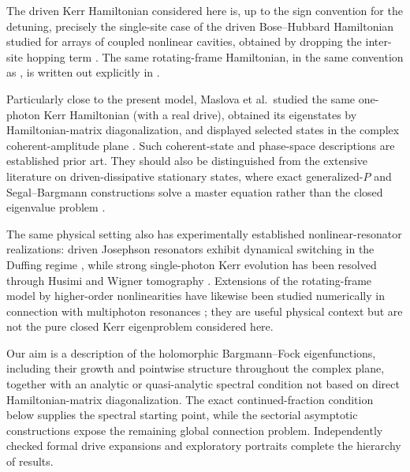 \documentclass[11pt]{article}
\theoremstyle{remark}
\begin{document}
The driven Kerr Hamiltonian considered here is, up to the sign convention for
the detuning, precisely the single-site case of the driven Bose--Hubbard
Hamiltonian studied for arrays of coupled nonlinear cavities, obtained by
dropping the inter-site hopping term \cite{LeBoiteOrsoCiuti2013DrivenBH}.  The
same rotating-frame Hamiltonian, in the same convention as
\cite{LeBoiteOrsoCiuti2013DrivenBH}, is written out explicitly in
\cite{VicentiniEtAl2018CriticalSlowing}.

Particularly close to the present model, Maslova et al.\ studied the same
one-photon Kerr Hamiltonian (with a real drive), obtained its
eigenstates by Hamiltonian-matrix diagonalization, and displayed selected
states in the complex coherent-amplitude plane
\cite{MaslovaEtAl2019Squeezing}.  Such coherent-state and phase-space
descriptions are established prior art.  They should also be distinguished
from the extensive literature on driven-dissipative stationary states, where
exact generalized-\(P\) and Segal--Bargmann constructions solve a master
equation rather than the closed eigenvalue problem
\cite{DrummondWalls1980Bistability,RobertsClerk2020Kerr}.

The same physical setting also has experimentally established nonlinear-resonator
realizations: driven Josephson resonators exhibit dynamical switching in the
Duffing regime \cite{SiddiqiEtAl2004Bifurcation}, while strong single-photon
Kerr evolution has been resolved through Husimi and Wigner tomography
\cite{KirchmairEtAl2013Kerr}.  Extensions of the rotating-frame model by
higher-order nonlinearities have likewise been studied numerically in connection
with multiphoton resonances \cite{AnikinEtAl2021Multiphoton}; they are useful
physical context but are not the pure closed Kerr eigenproblem considered here.

Our aim is a description of the holomorphic Bargmann--Fock eigenfunctions,
including their growth and pointwise structure throughout the complex plane, together with
an analytic or quasi-analytic spectral condition not based on direct
Hamiltonian-matrix diagonalization.  The exact continued-fraction condition
below supplies the spectral starting point, while the sectorial asymptotic
constructions expose the remaining global connection problem.
Independently checked formal drive expansions and exploratory portraits
complete the hierarchy of results.
\end{document}
